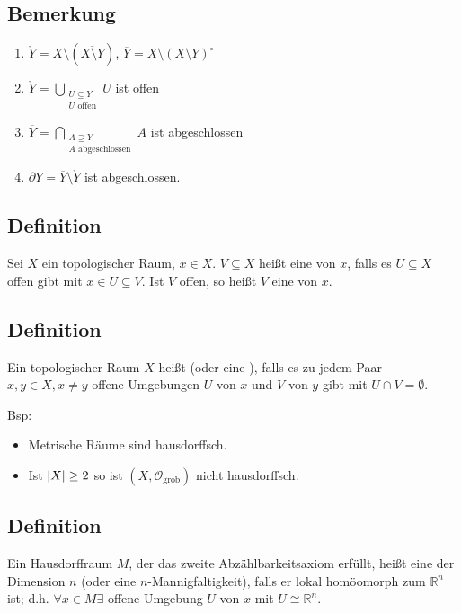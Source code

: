 \subsection[Bemerkung: Gleichungen für Inneres, Abschluss und Rand]{Bemerkung} %
\label{sub:120}
\begin{enumerate}[1)]
	\item $\mathring Y = X \setminus (\overline{X \setminus Y} )$, $\overline{Y} = X \setminus (X \setminus Y)^\circ  $
	\item $\mathring Y = \bigcup_{\substack{U \subseteq Y \\ U \text{ offen}}} U$ ist offen
	\item $\overline{Y} = \bigcap_{\substack{A \supseteq Y \\ A \text{ abgeschlossen}}} A$ ist abgeschlossen
	\item $\partial Y = \overline{Y} \setminus \mathring Y $ ist abgeschlossen.
\end{enumerate}

\subsection[Definition: Umgebung]{Definition} %
\label{sub:121}
Sei $X$ ein topologischer Raum, $x \in X$. $V \subseteq X$ heißt eine  von $x$, falls es $U \subseteq X$ offen gibt mit $x \in U \subseteq V$. Ist $V$
offen, so heißt $V$ eine  von $x$. 

\subsection[Definition: Hausdorffraum]{Definition} %
\label{sub:122}
Ein topologischer Raum $X$ heißt  (oder eine ), falls es zu jedem Paar $x,y \in X, x \not= y$ offene Umgebungen $U$ von $x$ und
$V$ von $y$ gibt mit $U \cap V = \emptyset$.

Bsp: \begin{itemize}
	\item Metrische Räume sind hausdorffsch.
	\item Ist $\abs*{X} \ge 2 $ so ist $(X, \mathcal{O}_{\text{grob}} )$ nicht hausdorffsch.
\end{itemize}

\subsection[Definition: topologische Mannigfaltigkeit]{Definition} %
\label{sub:123}
Ein Hausdorffraum $M$, der das zweite Abzählbarkeitsaxiom erfüllt, heißt eine  der Dimension $n$ (oder eine $n$-Mannigfaltigkeit), 
falls er lokal homöomorph zum $\mathds{R}^n$ ist; d.h. $\forall x \in M \exists$ offene Umgebung $U$ von $x$ mit $U \cong \mathds{R}^n$.
\newpage

